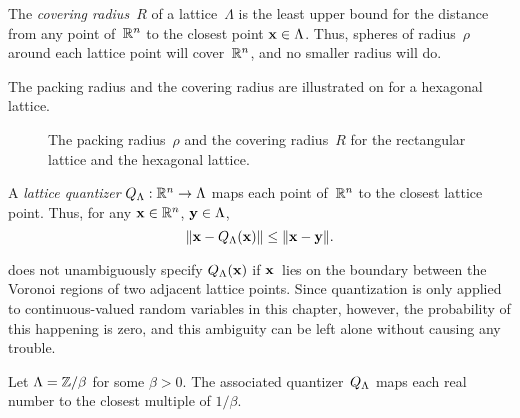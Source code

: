 \begin{subappendices}
  \begin{definition}
    The \emph{covering radius}~$R$ of a lattice~$\Lambda$ is the least upper
    bound for the distance from any point of~$\mathbb{R}^n$ to the closest point $\mathbf{x} \in
    \Lambda$. Thus, spheres of radius~$\rho$ around each lattice point will
    cover~$\mathbb{R}^n$, and no smaller radius will do.~\cite{ConwayS1988}
  \end{definition}

  The packing radius and the covering radius are illustrated on
   for a hexagonal lattice.
  \begin{figure}[tbp]
    \begin{center}
      
    \end{center}
    \caption{The packing radius~$\rho$ and the covering radius~$R$ for the
    rectangular lattice and the hexagonal lattice.}
    \label{fig:packingcoveringr}
  \end{figure}

  \begin{definition}
    \label{def:latticequant}
    A \emph{lattice quantizer} ${Q_{\Lambda}} : \mathbb{R}^n \rightarrow \Lambda$ maps each point
    of~$\mathbb{R}^n$ to the closest lattice point. Thus, for any $\mathbf{x} \in \mathbb{R}^n$, $\mathbf{y} \in
    \Lambda$,
    \begin{equation*}
      \| \mathbf{x} - {Q_{\Lambda}}(\mathbf{x}) \| \le \|\mathbf{x} - \mathbf{y}\|.
    \end{equation*}
  \end{definition}

  \begin{remark}
    \label{rem:latticequant}
     does not unambiguously specify ${Q_{\Lambda}}(\mathbf{x})$ if $\mathbf{x}$~lies
    on the boundary between the Voronoi regions of two adjacent lattice points.
    Since quantization is only applied to continuous-valued random variables in
    this chapter, however, the probability of this happening is zero, and this
    ambiguity can be left alone without causing any trouble.
  \end{remark}

  \begin{example}
    Let $\Lambda = \mathbb{Z} / \beta$ for some $\beta >0$. The associated
    quantizer~${Q_{\Lambda}}$ maps each real number to the closest multiple of $1/\beta$.
  \end{example}


\end{subappendices}
